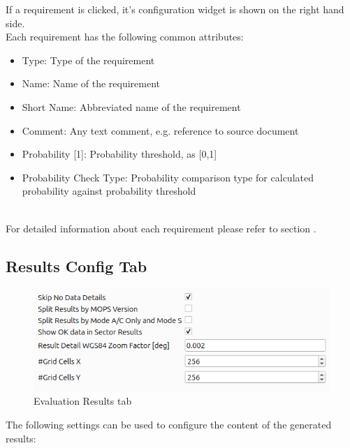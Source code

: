 If a requirement is clicked, it's configuration widget is shown on the right hand side. \\

Each requirement has the following common attributes:
\begin{itemize}  
\item Type: Type of the requirement
\item Name: Name of the requirement
\item Short Name: Abbreviated name of the requirement
\item Comment: Any text comment, e.g. reference to source document
\item Probability [1]: Probability threshold, as [0,1]
\item Probability Check Type: Probability comparison type for calculated probability against probability threshold
\end{itemize}
\ \\

For detailed information about each requirement please refer to section .

\subsection{Results Config Tab}

\begin{figure}[H]
  \hspace*{-2cm}
  \center
    \includegraphics[width=12cm,frame]{figures/eval_results_config.png}
  \caption{Evaluation Results tab}
\end{figure}

The following settings can be used to configure the content of the generated results:

